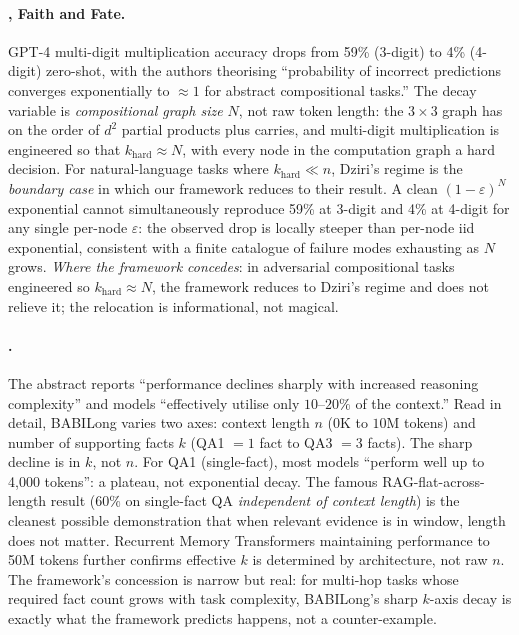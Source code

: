 \documentclass{article}
\theoremstyle{taeplain}
\theoremstyle{taedefn}
\newcommand{\teApprox}{\ensuremath{\approx}}
\begin{document}
\paragraph{\citet{dziri2023faith}, Faith and Fate.}
GPT-4 multi-digit multiplication accuracy drops from 59\% (3-digit) to 4\% (4-digit) zero-shot, with the authors theorising ``probability of incorrect predictions converges exponentially to $\teApprox 1$ for abstract compositional tasks.'' The decay variable is \emph{compositional graph size $N$}, not raw token length: the $3 \times 3$ graph has on the order of $d^2$ partial products plus carries, and multi-digit multiplication is engineered so that $k_{\text{hard}} \teApprox N$, with every node in the computation graph a hard decision. For natural-language tasks where $k_{\text{hard}} \ll n$, Dziri's regime is the \emph{boundary case} in which our framework reduces to their result. A clean $(1-\varepsilon)^N$ exponential cannot simultaneously reproduce 59\% at 3-digit and 4\% at 4-digit for any single per-node $\varepsilon$: the observed drop is locally steeper than per-node iid exponential, consistent with a finite catalogue of failure modes exhausting as $N$ grows. \emph{Where the framework concedes}: in adversarial compositional tasks engineered so $k_{\text{hard}} \teApprox N$, the framework reduces to Dziri's regime and does not relieve it; the relocation is informational, not magical.

\paragraph{\citet{kuratov2024babilong}.}
The abstract reports ``performance declines sharply with increased reasoning complexity'' and models ``effectively utilise only $10$--$20\%$ of the context.'' Read in detail, BABILong varies two axes: context length $n$ ($0$K to $10$M tokens) and number of supporting facts $k$ (QA1 $=1$ fact to QA3 $=3$ facts). The sharp decline is in $k$, not $n$. For QA1 (single-fact), most models ``perform well up to 4,000 tokens'': a plateau, not exponential decay. The famous RAG-flat-across-length result ($60\%$ on single-fact QA \emph{independent of context length}) is the cleanest possible demonstration that when relevant evidence is in window, length does not matter. Recurrent Memory Transformers maintaining performance to 50M tokens further confirms effective $k$ is determined by architecture, not raw $n$. The framework's concession is narrow but real: for multi-hop tasks whose required fact count grows with task complexity, BABILong's sharp $k$-axis decay is exactly what the framework predicts happens, not a counter-example.
\end{document}
